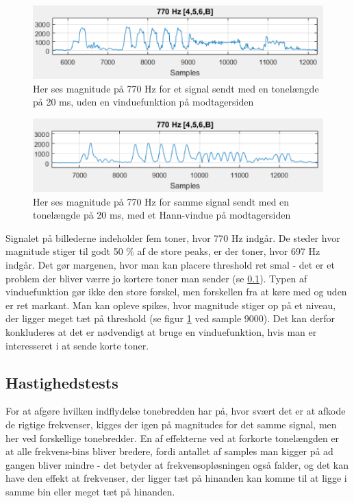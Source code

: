 \begin{figure}[h]
\centering
\includegraphics[scale=0.8]{Billeder/NoWindow.PNG}
\caption{Her ses magnitude på 770 Hz for et signal sendt med en tonelængde på 20 ms, uden en vinduefunktion på modtagersiden}
\label{fig:NoWindow}
\end{figure}

\begin{figure}[h]
\centering
\includegraphics[scale=0.8]{Billeder/HannWindow.PNG}
\caption{Her ses magnitude på 770 Hz for samme signal sendt med en tonelængde på 20 ms, med et Hann-vindue på modtagersiden}
\label{fig:HannWindow}
\end{figure}

Signalet på billederne indeholder fem toner, hvor 770 Hz indgår. De steder hvor magnitude stiger til godt 50 \% af de store peaks, er der toner, hvor 697 Hz indgår. Det gør margenen, hvor man kan placere threshold ret smal - det er et problem der bliver værre jo kortere toner man sender (se \ref{sec:hastighedstest}). Typen af vinduefunktion gør ikke den store forskel, men forskellen fra at køre med og uden er ret markant. Man kan opleve spikes, hvor magnitude stiger op på et niveau, der ligger meget tæt på threshold (se figur \ref{fig:NoWindow} ved sample 9000). Det kan derfor konkluderes at det er nødvendigt at bruge en vinduefunktion, hvis man er interesseret i at sende korte toner.

\subsection{Hastighedstests} \label{sec:hastighedstest}

For at afgøre hvilken indflydelse tonebredden har på, hvor svært det er at afkode de rigtige frekvenser, kigges der igen på magnitudes for det samme signal, men her ved forskellige tonebredder. En af effekterne ved at forkorte tonelængden er at alle frekvens-bins bliver bredere, fordi antallet af samples man kigger på ad gangen bliver mindre - det betyder at frekvensopløsningen også falder, og det kan have den effekt at frekvenser, der ligger tæt på hinanden kan komme til at ligge i samme bin eller meget tæt på hinanden. 

